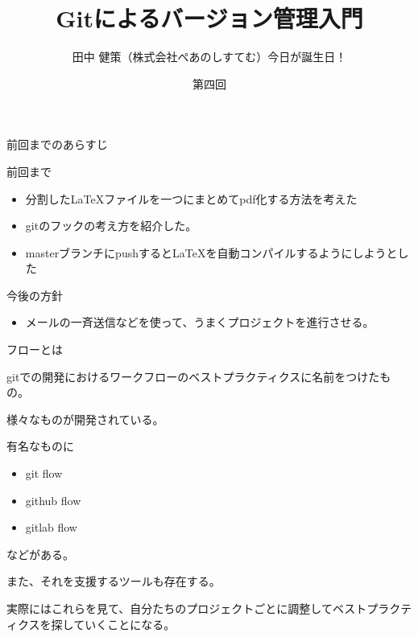 \documentclass[12pt, unicode]{beamer}
\title{Gitによるバージョン管理入門}
\author{田中 健策（株式会社ぺあのしすてむ）今日が誕生日！}
\date[2019/10/25]{第四回}
\begin{document}
\frame{\maketitle}

\begin{frame}{前回までのあらすじ}

前回まで
\begin{itemize}
\item 分割したLaTeXファイルを一つにまとめてpdf化する方法を考えた
\item gitのフックの考え方を紹介した。
\item masterブランチにpushするとLaTeXを自動コンパイルするようにしようとした
\end{itemize}

今後の方針
\begin{itemize}
\item メールの一斉送信などを使って、うまくプロジェクトを進行させる。
\end{itemize}

\end{frame}
\begin{frame}{フローとは}

gitでの開発におけるワークフローのベストプラクティクスに名前をつけたもの。

様々なものが開発されている。

有名なものに

\begin{itemize}
\item git flow
\item github flow
\item gitlab flow
\end{itemize}

などがある。

また、それを支援するツールも存在する。

実際にはこれらを見て、自分たちのプロジェクトごとに調整してベストプラクティクスを探していくことになる。

\end{frame}
\end{document}
